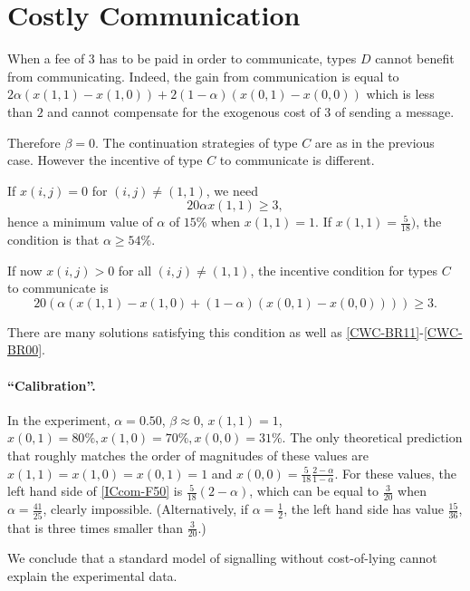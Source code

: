 \documentclass[12pt]{article}
\begin{document}
\section{Costly Communication}
When a fee of $3$ has to be paid in order to communicate, types $D$ cannot benefit from communicating. Indeed, the gain from communication is equal to $2\alpha(x(1,1)-x(1,0))+2(1-\alpha)(x(0,1)-x(0,0)) $ which is less than $2$ and cannot compensate for the exogenous cost of $3$ of sending a message.

Therefore $\beta=0$. The continuation strategies of type $C$ are as in the previous case. However the incentive of type $C$ to communicate is different. 

If $x(i,j)=0$ for $(i,j)\neq (1,1)$, we need
\[
20 \alpha x(1,1)\geq 3,
\]
hence a minimum value of $\alpha$ of $15\%$ when $x(1,1)=1$. If $x(1,1)=\frac{5}{18})$, the condition is that $\alpha \geq 54\%$.

If now $x(i,j)>0$ for all $(i,j)\neq (1,1)$, the incentive condition for types $C$ to communicate is
\begin{equation}\label{ICcom-F50}
	20 (\alpha(x(1,1)-x(1,0)+(1-\alpha)(x(0,1)-x(0,0))))\geq 3.	
\end{equation}

There are many solutions satisfying this condition as well as \eqref{CWC-BR11}-\eqref{CWC-BR00}.

\paragraph{``Calibration''.} In the experiment, $\alpha=0.50$, $\beta\approx 0$, $x(1,1)=1$, $x(0,1)=80\%, x(1,0)=70\%, x(0,0)=31\%$. The only theoretical prediction that roughly matches the order of magnitudes of these values are $x(1,1)=x(1,0)=x(0,1)=1$ and $x(0,0)=\frac{5}{18}\frac{2-\alpha}{1-\alpha}$. For these values, the left hand side of \eqref{ICcom-F50} is $\frac{5}{18}(2-\alpha)$, which can be equal to $\frac{3}{20}$ when $\alpha=\frac{41}{25}$, clearly impossible. (Alternatively, if $\alpha=\frac{1}{2}$, the left hand side has value $\frac{15}{36}$, that is three times smaller than $\frac{3}{20}$.)

We conclude that a standard model of signalling without cost-of-lying cannot explain the experimental data.

 

\end{document}
